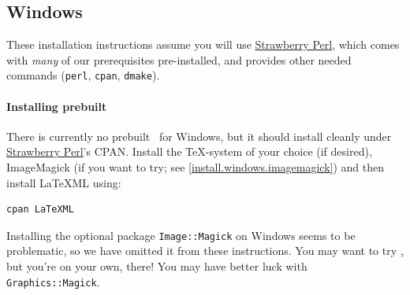 \documentclass{article}
\begin{document}

\subsection{Windows}
These installation instructions assume you will use
\href{http://strawberryperl.com}{Strawberry Perl},
which comes with \emph{many} of our prerequisites pre-installed,
and provides other needed commands (\texttt{perl}, \texttt{cpan}, \texttt{dmake}).

\paragraph{Installing prebuilt}\label{install.windows}
There is currently no prebuilt \LaTeXML\ for Windows,
but it should install cleanly under \href{http://strawberryperl.com}{Strawberry Perl}'s CPAN.
Install the \TeX-system of your choice (if desired),
ImageMagick (if you want to try; see \ref{install.windows.imagemagick})
and then install LaTeXML using:
\begin{lstlisting}[style=shell]
cpan LaTeXML
\end{lstlisting}

Installing the optional package \texttt{Image::Magick} on Windows seems to be problematic,
so we have omitted it from these instructions.
You may want to try \href{ImageMagick}, but
you're on your own, there!  You may  have better luck with \texttt{Graphics::Magick}.
\end{document}
